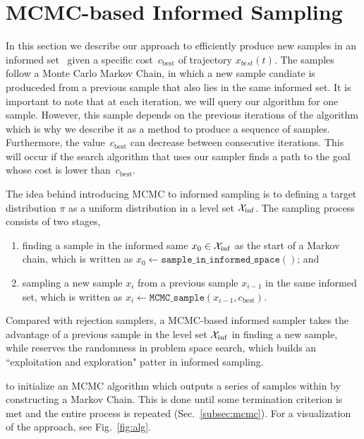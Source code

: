 \documentclass[letterpaper, 10 pt, conference]{ieeeconf}  %
\begin{document}
\section{MCMC-based Informed Sampling}
\label{sec:algorithm}

In this section we describe our approach to efficiently produce new samples in an informed set ~\Cinf given a specific cost~$c_{\text{best}}$ of trajectory $x_{best}(t)$.
The samples follow a Monte Carlo Markov Chain, in which a new sample candiate is produceded from a previous sample that also lies in the same informed set.
It is important to note that at each iteration, we will query our algorithm for one sample. 
However, this sample depends on the previous iterations of the algorithm which is why we describe it as a method to produce a sequence of samples.
Furthermore, the value~$c_{\text{best}}$ can decrease between consecutive iterations.
This will occur if the search algorithm that uses our sampler finds a path to the goal whose cost is lower than~$c_{\text{best}}$.

The idea behind introducing MCMC to informed sampling is to defining a target distribution $ \pi $ as a uniform distribution in a level set $ \mathcal{X}_{\rm {inf}} $.
The sampling process consists of two stages,
\begin{enumerate}
	\item finding a sample in the informed same $ x_0 \in \mathcal{X}_{\rm {inf}} $ as the start of a Markov chain, which is written as 
	$ x_{0} \leftarrow \texttt{sample\_in\_informed\_space}( )$; and
	\item sampling a new sample $ x_i $ from a previous sample $ x_{i-1} $ in the same informed set, which is written as  $x_{i} \leftarrow \texttt{MCMC\_sample} (x_{i-1}, c_{\text{best}})$.
\end{enumerate}
Compared with rejection samplers, a MCMC-based informed sampler takes the advantage of a previous sample in the level set $ \mathcal{X}_{\rm {inf}} $ in finding a new sample, while reserves the randomness in problem space search, which builds an ``exploitation and exploration" patter in informed sampling.

to initialize an MCMC algorithm which outputs a series of samples within \Cinf by constructing a Markov Chain.
This is done until some termination criterion is met and the entire process is repeated (Sec.~\ref{subsec:mcmc}). 
For a visualization of the approach, see Fig.~\ref{fig:alg}.
\end{document}
